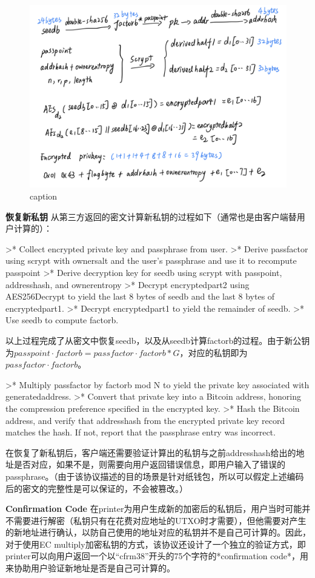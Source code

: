 \begin{figure}[h]
\centering
\includegraphics[width=.7\textwidth]{./ec.png}
\caption{caption}\label{fig-parsesig}
\end{figure}

\textbf{恢复新私钥}
从第三方返回的密文计算新私钥的过程如下（通常也是由客户端替用户计算的）：

>* Collect encrypted private key and passphrase from user.
>* Derive passfactor using scrypt with ownersalt and the user's passphrase and use it to recompute passpoint
>* Derive decryption key for seedb using scrypt with passpoint, addresshash, and ownerentropy
>* Decrypt encryptedpart2 using AES256Decrypt to yield the last 8 bytes of seedb and the last 8 bytes of encryptedpart1.
>* Decrypt encryptedpart1 to yield the remainder of seedb.
>* Use seedb to compute factorb.

以上过程完成了从密文中恢复seedb，以及从seedb计算factorb的过程。由于新公钥为$passpoint\cdot factorb=passfactor\cdot factorb *G$，对应的私钥即为$passfactor\cdot factorb$。

>* Multiply passfactor by factorb mod N to yield the private key associated with generatedaddress.
>* Convert that private key into a Bitcoin address, honoring the compression preference specified in the encrypted key.
>* Hash the Bitcoin address, and verify that addresshash from the encrypted private key record matches the hash. If not, report that the passphrase entry was incorrect.

在恢复了新私钥后，客户端还需要验证计算出的私钥与之前addresshash给出的地址是否对应，如果不是，则需要向用户返回错误信息，即用户输入了错误的passphrase。（由于该协议描述的目的场景是针对纸钱包，所以可以假定上述编码后的密文的完整性是可以保证的，不会被篡改。）

\textbf{ Confirmation Code}
在printer为用户生成新的加密后的私钥后，用户当时可能并不需要进行解密（私钥只有在花费对应地址的UTXO时才需要），但他需要对产生的新地址进行确认，以防自己使用的地址对应的私钥并不是自己可计算的。因此，对于使用EC multiply加密私钥的方式，该协议还设计了一个独立的验证方式，即printer可以向用户返回一个以“cfrm38”开头的75个字符的*confirmation code*，用来协助用户验证新地址是否是自己可计算的。
 
